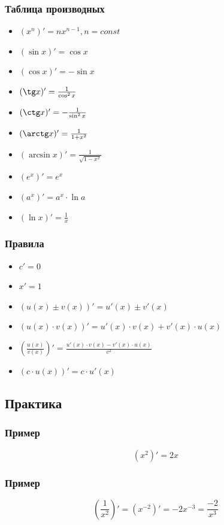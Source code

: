 \documentclass{article}
\begin{document}
\subsubsection{Таблица производных}
\begin{itemize}
    \item $(x^n)' = nx^{n - 1}, n = const$
    \item $(\sin x)' = \cos x$
    \item $(\cos x)' = -\sin x$
    \item $(\tg x)'= \frac{1}{\cos^2 x}$
    \item $(\ctg x)'= - \frac{1}{\sin^2 x}$
    \item $(\arctg x)' = \frac{1}{1 + x^2}$
    \item $(\arcsin x)' = \frac{1}{\sqrt{1 - x^2}}$
    \item $(e^x)' = e^x$
    \item $(a^x)' = a^x \cdot \ln a$
    \item $(\ln x)' = \frac{1}{x}$
\end{itemize}

\subsubsection{Правила}
\begin{itemize}
    \item $c' = 0$
    \item $x' = 1$
    \item $(u(x) \pm v(x))' = u'(x) \pm v'(x)$
    \item $(u(x) \cdot v(x))' = u'(x) \cdot v(x) + v'(x) \cdot u(x)$
    \item $\left( \frac{u(x)}{v(x)} \right)' = \frac{u'(x) \cdot v(x) - v'(x) \cdot u(x)}{v^2}$
    \item $(c \cdot u(x))' = c \cdot u'(x)$
\end{itemize}


\subsection{Практика}

\subsubsection{Пример}
\[
    (x^2)' = 2x
\]

\subsubsection{Пример}
\[
    \left( \frac{1}{x^2} \right)' = (x^{-2})' = -2x^{-3} = \frac{-2}{x^3}
\]
\end{document}
